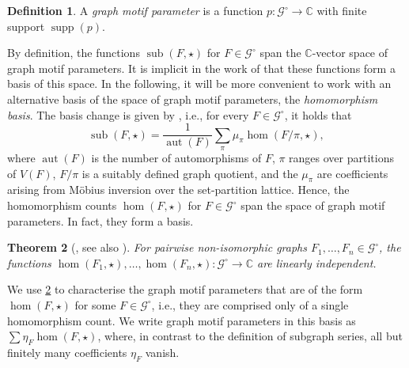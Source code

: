 \documentclass[11pt]{scrartcl}
\theoremstyle{definition}
\newtheorem{definition}{Definition}[section]
\theoremstyle{plain}
\newtheorem{theorem}[definition]{Theorem}
\theoremstyle{remark}
\DeclareMathOperator{\supp}{supp}
\DeclareMathOperator{\aut}{aut}
\DeclareMathOperator{\sub}{sub}
\newcommand{\lG}{\mathcal{G}^\circ}
\begin{document}
	\begin{definition}\label{def:gmp}
		A \emph{graph motif parameter} is a function $p \colon \lG \to \mathbb{C}$ with finite support $\supp(p)$.
	\end{definition}


	By definition, the functions $\sub(F, \star)$ for $F \in \lG$ span the $\mathbb{C}$-vector space of graph motif parameters. 
	It is implicit in the work of \textcite{lovasz_operations_1967} that these functions form a basis of this space.
	In the following, it will be more convenient to work with an alternative basis of the space of graph motif parameters, the \emph{homomorphism basis}.
    The basis change is given by 
	\cite[(5.18)]{lovasz_large_2012}, i.e., for every $F \in \lG$, it holds that
	\begin{equation}\label{eq:sub-to-hom}
		\sub(F, \star) = \frac{1}{\aut(F)} \sum_{\pi} \mu_\pi \hom(F/\pi, \star),
	\end{equation}
	where $\aut(F)$ is the number of automorphisms of $F$, $\pi$ ranges over partitions of $V(F)$, $F/\pi$ is a suitably defined graph quotient, and the $\mu_\pi$ are coefficients arising from M\"obius inversion over the set-partition lattice.
	Hence, the homomorphism counts $\hom(F, \star)$ for $F \in \lG$ span the space of graph motif parameters. In fact, they form a basis.

	\begin{theorem}[\textcite{lovasz_operations_1967}, see also {\cite[Proposition~5.44b]{lovasz_large_2012}}]\label{thm:lovasz-linear-independent}
		For pairwise non-isomorphic graphs $F_1, \dots, F_n \in \lG$,
		the functions $\hom(F_1, \star), \dots, \hom(F_n, \star) \colon \lG \to \mathbb{C}$ are linearly independent.
	\end{theorem}

	We use \cref{thm:lovasz-linear-independent} to characterise the graph motif parameters that are of the form $\hom(F, \star)$ for some $F \in \lG$, i.e., they are comprised only of a single homomorphism count.
	We write graph motif parameters in this basis as $\sum \eta_F \hom(F, \star)$, where, in contrast to the definition of subgraph series, all but finitely many coefficients $\eta_F$ vanish.

	
\end{document}
